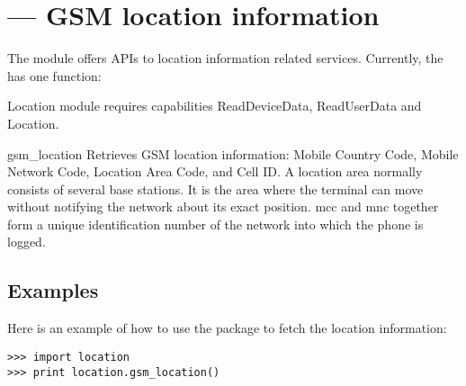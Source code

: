 %
%
%

\section{ ---
	 GSM location information}
\label{sec:location}


The  module offers APIs to location information related 
services. Currently, the  has one function:

\begin{notice}[note]
Location module requires capabilities ReadDeviceData, ReadUserData and Location.
\end{notice}

\begin{funcdesc}{gsm_location}{}
Retrieves GSM location information: Mobile Country Code, Mobile Network Code, 
Location Area Code, and Cell ID. A location area normally consists of several 
base stations. It is the area where the terminal can move without notifying the 
network about its exact position. mcc and mnc together form a unique 
identification number of the network into which the phone is logged.
\end{funcdesc}

\subsection{Examples}

Here is an example of how to use the  package to
fetch the location information:

\begin{verbatim}
>>> import location
>>> print location.gsm_location()
\end{verbatim}
